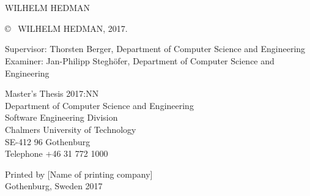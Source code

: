 \newpage
\thispagestyle{plain}
\vspace*{4.5cm}
\fullt\\
\subt\\
WILHELM HEDMAN \setlength{\parskip}{1cm}

\copyright ~ WILHELM HEDMAN, 2017. \setlength{\parskip}{1cm}

Supervisor: Thorsten Berger, Department of Computer Science and Engineering\\
Examiner: Jan-Philipp Steghöfer, Department of Computer Science and Engineering \setlength{\parskip}{1cm}

Master's Thesis 2017:NN\\	%
Department of Computer Science and Engineering\\
Software Engineering Division\\
Chalmers University of Technology\\
SE-412 96 Gothenburg\\
Telephone +46 31 772 1000 \setlength{\parskip}{0.5cm}

\vfill


Printed by [Name of printing company]\\
Gothenburg, Sweden 2017

